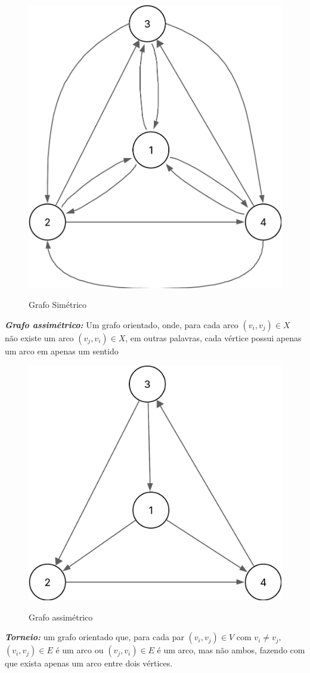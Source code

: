 	\begin{figure} [H]
		\centering
		\caption{Grafo Simétrico}%
		\label{fig:grafSimetrico}%
		\includegraphics[width=0.5\linewidth,angle=0]{figuras/tiposgrafos/grafSimetrico.png}%
		\\
	\end{figure}
	\textit{\textbf{Grafo assimétrico:}}  Um grafo orientado, onde, para cada arco $ (v_i, v_j) \in X$ não existe um arco $ (v_j,v_i)\in X $, em outras palavras, cada vértice possui apenas um arco em apenas um sentido \\
	\begin{figure} [H]
		\centering
		\caption{Grafo assimétrico}%
		\label{fig:grafAssimet}%
		\includegraphics[width=0.5\linewidth,angle=0]{figuras/tiposgrafos/grafAssimet.png}%
		\\
	\end{figure}
	\textit{\textbf{Torneio:}} um grafo orientado que, para cada par $ (v_i, v_j) \in V $ com $ v_i \neq v_j $, $ (v_i, v_j)\in E $ é um arco ou $ (v_j, v_i) \in E $ é um arco, mas não ambos, fazendo com que exista apenas um arco entre dois vértices.
